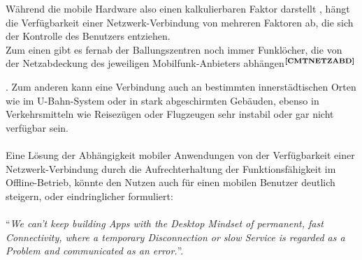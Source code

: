 \noindent
Während die mobile Hardware also
einen kalkulierbaren Faktor darstellt%
, hängt die Verfügbarkeit einer Netzwerk-Verbindung von mehreren Faktoren ab, die sich der Kontrolle des Benutzers entziehen.\\
Zum einen gibt es fernab der Ballungszentren noch immer Funklöcher, die von der Netzabdeckung des jeweiligen Mobilfunk-Anbieters abhängen$^{\textbf{\ref{CMTNETZABD}}}$%
\addtocounter{footnote}{1}%
.
Zum anderen kann eine Verbindung auch an bestimmten innerstädtischen Orten wie im U-Bahn-System oder in stark abgeschirmten Gebäuden, ebenso in Verkehrsmitteln wie Reisezügen oder Flugzeugen sehr instabil oder gar nicht verfügbar sein.\\ \\
\noindent
Eine Lösung der Abhängigkeit mobiler Anwendungen von der Verfügbarkeit einer Netzwerk-Verbindung durch die Aufrechterhaltung der Funktionsfähigkeit im Offline-Betrieb, könnte den Nutzen auch für einen mobilen Benutzer deutlich steigern, oder eindringlicher formuliert:\\ \\
"`\textit{We can’t keep building Apps with the Desktop Mindset of permanent, fast Connectivity, where a temporary Disconnection or slow Service is regarded as a Problem and communicated as an error.}"'\cite{OFFLFIRST:WWW}.
	 
